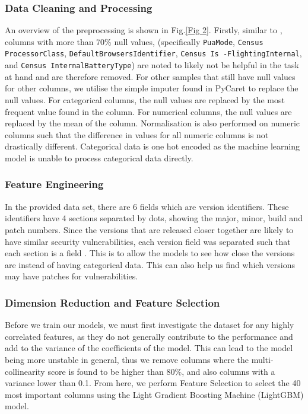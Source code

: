 \documentclass[runningheads]{llncs}
\begin{document}
\subsubsection{Data Cleaning and Processing} 
An overview of the preprocessing is shown in Fig.\ref{Fig 2}. Firstly, similar to \cite{shahini2019}, columns with more than 70\% null values, {(specifically \texttt{PuaMode}, \texttt{Census
ProcessorClass}, \texttt{DefaultBrowsersIdentifier}, \texttt{Census Is
-FlightingInternal}, and \texttt{Census InternalBatteryType})} are noted to likely not be helpful in the task at hand and are therefore removed. For other samples that still have null values for other columns, we utilise the simple imputer found in PyCaret to replace the null values. For categorical columns, the null values are replaced by the most frequent value found in the column. For numerical columns, the null values are replaced by the mean of the column. Normalisation is also performed on numeric columns such that the difference in values for all numeric columns is not drastically different. Categorical data is one hot encoded as the machine learning model is unable to process categorical data directly.
\subsubsection{Feature Engineering} 
In the provided data set, there are 6 fields which are version identifiers. These identifiers have 4 sections separated by dots, showing the major, minor, build and patch numbers. Since the versions that are released closer together are likely to have similar security vulnerabilities, each version field was separated such that each section is a field \cite{iop2020}. This is to allow the models to see how close the versions are instead of having categorical data. This can also help us find which versions may have patches for vulnerabilities.
\subsubsection{Dimension Reduction and Feature Selection}
Before we train our models, we must first investigate the dataset for any highly correlated features, as they do not generally contribute to the performance and add to the variance of the coefficients of the model. This can lead to the model being more unstable in general, thus we remove columns where the multi-collinearity score is found to be higher than 80\%, and also columns with a variance lower than 0.1. From here, we perform Feature Selection to select the 40 most important columns using the Light Gradient Boosting Machine (LightGBM) model.
\end{document}
